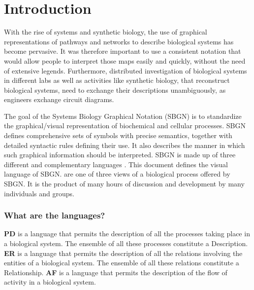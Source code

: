 

\chapter{Introduction}

With the rise of systems and synthetic biology, the use of graphical
representations of pathways and networks to describe biological
systems has become pervasive. It was therefore important to use a
consistent notation that would allow people to interpret those maps
easily and quickly, without the need of extensive
legends. Furthermore, distributed investigation of biological systems
in different labs as well as activities like synthetic biology, that
reconstruct biological systems, need to exchange their descriptions
unambiguously, as engineers exchange circuit diagrams.

The goal of the Systems Biology Graphical Notation (SBGN) is to
standardize the graphical/vis\-ual representation of biochemical and
cellular processes. SBGN defines comprehensive sets of symbols with
precise semantics, together with detailed syntactic rules defining
their use. It also describes the manner in which such graphical
information should be interpreted. SBGN is made up of three different
and complementary languages \cite{LeNovere:2009p1}. This document
defines the \emph{\PD} visual language of SBGN. \PDs are one of three
views of a biological process offered by SBGN.  It is the product of
many hours of discussion and development by many individuals and
groups.
 
\subsection{What are the languages?}

\textbf{PD} is a language that permits the description of all the processes taking place in a biological system. The ensemble of all these processes constitute a Description. \textbf{ER} is a language that permits the description of all the relations involving the entities of a biological system. The ensemble of all these relations constitute a Relationship.\textbf{ AF} is a language that permits the description of the flow of activity in a biological system.

